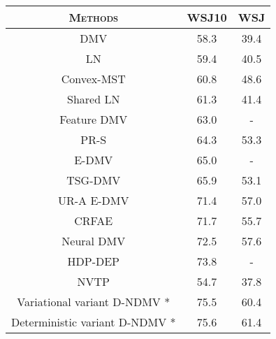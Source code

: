 \documentclass[11pt]{article}
\begin{document}
\begin{table}[tbp]
\centering
\small
\begin{tabular}{cccc}
\hline
\multicolumn{2}{c|}{\bf\textsc{Methods}}              & \multicolumn{1}{c|}{\bf\textsc{WSJ10}} & \bf\textsc{WSJ}  \\ \hline
\multicolumn{2}{c|}{DMV\cite{Klein2004CorpusBasedIO}}                  & \multicolumn{1}{c|}{58.3}  & 39.4 \\
\multicolumn{2}{c|}{LN \cite{cohen2009logistic}}                   & \multicolumn{1}{c|}{59.4}  & 40.5 \\
\multicolumn{2}{c|}{Convex-MST \cite{Grave2015ACA}}           & \multicolumn{1}{c|}{60.8}  & 48.6 \\
\multicolumn{2}{c|}{Shared LN \cite{Cohen2009SharedLN}}            & \multicolumn{1}{c|}{61.3}  & 41.4 \\
\multicolumn{2}{c|}{Feature DMV  \cite{berg-kirkpatrick-etal-2010-painless}}          & \multicolumn{1}{c|}{63.0}  & -    \\
\multicolumn{2}{c|}{PR-S \cite{Gillenwater2011PosteriorSI}}                 & \multicolumn{1}{c|}{64.3}  & 53.3 \\
\multicolumn{2}{c|}{E-DMV \cite{Headden2009ImprovingUD}}                & \multicolumn{1}{c|}{65.0}  & -    \\
\multicolumn{2}{c|}{TSG-DMV \cite{Blunsom2010UnsupervisedIO}}              & \multicolumn{1}{c|}{65.9}  & 53.1 \\
\multicolumn{2}{c|}{UR-A E-DMV \cite{Tu2012UnambiguityRF}}           & \multicolumn{1}{c|}{71.4}  & 57.0 \\
\multicolumn{2}{c|}{CRFAE \cite{Cai2017CRFAF}}                & \multicolumn{1}{c|}{71.7}  & 55.7 \\
\multicolumn{2}{c|}{Neural DMV \cite{Jiang2016UnsupervisedND}}         & \multicolumn{1}{c|}{72.5}  & 57.6 \\
\multicolumn{2}{c|}{HDP-DEP \cite{Naseem2010UsingUL}}               & \multicolumn{1}{c|}{73.8}  & -    \\
\multicolumn{2}{c|}{NVTP \cite{Li2018DependencyGI}}                 & \multicolumn{1}{c|}{54.7}  & 37.8 \\
\multicolumn{2}{c|}{Variational variant D-NDMV * \cite{Han2019EnhancingUG}}                          & \multicolumn{1}{c|}{75.5} & 60.4 \\
\multicolumn{2}{c|}{Deterministic variant D-NDMV * \cite{Han2019EnhancingUG}}                        & \multicolumn{1}{c|}{75.6} & 61.4 \\

\end{tabular}
\end{table}
\end{document}
